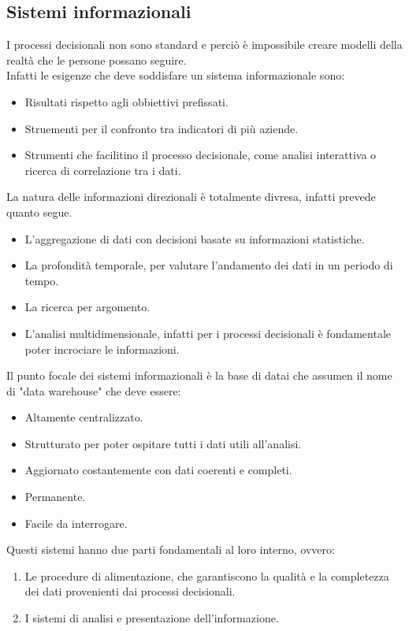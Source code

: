 \documentclass{book}
\begin{document}
    \subsection{Sistemi informazionali}
    I processi decisionali non sono standard e perciò è impossibile creare modelli della realtà che le persone possano seguire.\\
    Infatti le esigenze che deve soddisfare un sistema informazionale sono:
    \begin{itemize}
        \item Risultati rispetto agli obbiettivi prefissati.
        \item Struementi per il confronto tra indicatori di più aziende.
        \item Strumenti che facilitino il processo decisionale, come analisi interattiva o ricerca di correlazione tra i dati.
    \end{itemize}
    La natura delle informazioni direzionali è totalmente divresa, infatti prevede quanto segue.
    \begin{itemize}
        \item L'aggregazione di dati con decisioni basate su informazioni statistiche.
        \item La profondità temporale, per valutare l'andamento dei dati in un periodo di tempo.
        \item La ricerca per argomento.
        \item L'analisi multidimensionale, infatti per i processi decisionali è fondamentale poter incrociare le informazioni.
    \end{itemize}
    Il punto focale dei sistemi informazionali è la base di datai che assumen il nome di "data warehouse" che deve essere:
    \begin{itemize}
        \item Altamente centralizzato.
        \item Strutturato per poter ospitare tutti i dati utili all'analisi.
        \item Aggiornato costantemente con dati coerenti e completi.
        \item Permanente.
        \item Facile da interrogare.
    \end{itemize}
    Questi sistemi hanno due parti fondamentali al loro interno, ovvero:
    \begin{enumerate}
        \item Le procedure di alimentazione, che garantiscono la qualità e la completezza dei dati provenienti dai processi decisionali.
        \item I sistemi di analisi e presentazione dell'informazione.
    \end{enumerate}
\end{document}
